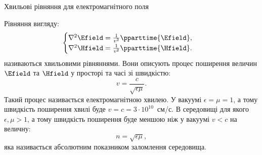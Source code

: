 \documentclass[onlytextwidth]{beamer}
\begin{document}
\begin{frame}{Хвильові рівняння для електромагнітного поля}{}
	\begin{block}{}\justifying
		Рівняння вигляду:
		\begin{equation*}
			\begin{cases}
				\nabla^2\Efield = \frac{1}{v^2}\pparttime{\Efield}, \\
				\nabla^2\Hfield = \frac{1}{v^2}\pparttime{\Hfield}.
			\end{cases}
		\end{equation*}
		називаються хвильовими рівняннями. Вони описують процес поширення величин $\Efield$ та $\Hfield$ у просторі та часі зі швидкістю:
		\begin{equation*}
			v= \frac{c}{\sqrt{\epsilon\mu}}.
		\end{equation*}
		Такий процес називається \alert{електромагнітною хвилею}.
		У вакуумі $\epsilon=\mu=1$, а тому швидкість поширення хвилі буде $v = c =3\cdot10^{10}$~см/с. В середовищі для якого $\epsilon, \mu > 1$, а тому
		швидкість поширення буде меншою ніж у вакуумі $v < c$ на величну:
		\begin{equation*}
			n = \sqrt{\epsilon\mu},
		\end{equation*}
		яка називається \alert{абсолютним показником заломлення середовища}.
	\end{block}
\end{frame}
\end{document}
